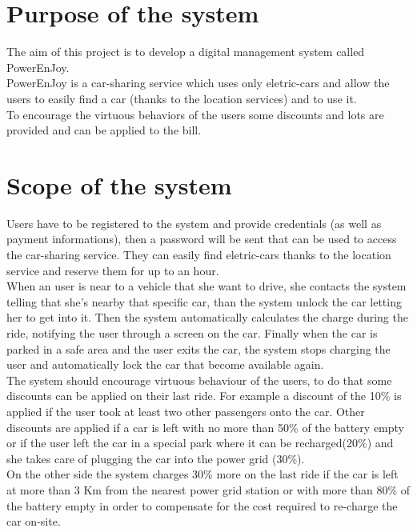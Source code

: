 \section{Purpose of the system}
The aim of this project is to develop a digital management system called PowerEnJoy. 
\\PowerEnJoy is a car-sharing service which uses only eletric-cars and allow the users to easily find a car (thanks to the location services) and to use it. 
\\To encourage the virtuous behaviors of the users some discounts and lots are provided and can be applied to the bill.
\section{Scope of the system}
Users have to be registered to the system and provide credentials (as well as payment informations), then a password will be sent that can be used to access the car-sharing service. 
They can easily find eletric-cars thanks to the location service and reserve them for up to an hour. 
\\When an user is near to a vehicle that she want to drive, she contacts the system telling that she's nearby that specific car, than the system unlock the car letting her to get into it. 
Then the system automatically calculates the charge during the ride, notifying the user through a screen on the car. 
Finally when the car is parked in a safe area and the user exits the car, the system stops charging the user and automatically lock the car that become available again.
\\The system should encourage virtuous behaviour of the users, %
to do that some discounts can be applied on their last ride. For example a discount of the 10\% is applied if the user took at least two other passengers onto the car. 
Other discounts are applied if a car is left with no more than 50\% of the battery empty or if the user left the car in a special park where it can be recharged(20\%) 
and she takes care of plugging the car into the power grid (30\%). 
\\On the other side the system charges 30\% more on the last ride if the car is left at more than 3 Km from the nearest power grid station or with more than 80\% of the battery empty 
in order to compensate for the cost required to re-charge the car on-site.
